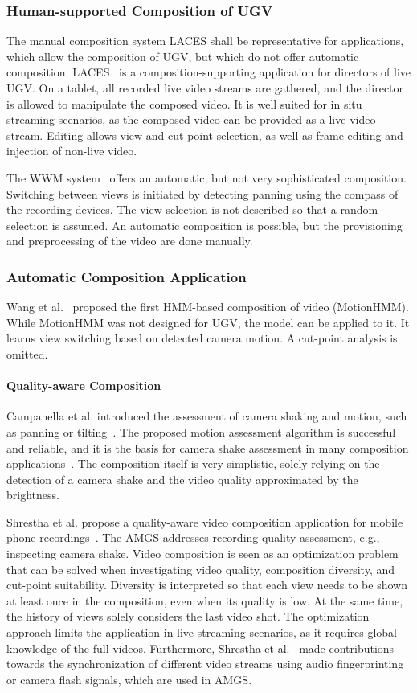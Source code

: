 \subsubsection{Human-supported Composition of UGV}
The manual composition system \ac{LACES} shall be representative for applications, which allow the composition of \ac{UGV}, but which do not offer automatic composition.
\ac{LACES}~\cite{Freeman2014} is a composition-supporting application for directors of live \ac{UGV}.
On a tablet, all recorded live video streams are gathered, and the director is allowed to manipulate the composed video.
It is well suited for in situ streaming scenarios, as the composed video can be provided as a live video stream.
Editing allows view and cut point selection, as well as frame editing and injection of non-live video.

The \ac{WWM} system~\cite{Freeman2014} offers an automatic, but not very sophisticated composition.
Switching between views is initiated by detecting panning using the compass of the recording devices. 
The view selection is not described so that a random selection is assumed.
An automatic composition is possible, but the provisioning and preprocessing of the video are done manually.
\subsubsection{Automatic Composition Application}
Wang et al.~\cite{Wang2008} proposed the first \ac{HMM}-based composition of video (MotionHMM).
While MotionHMM was not designed for \ac{UGV}, the model can be applied to it.
It learns view switching based on detected camera motion. 
A cut-point analysis is omitted.
\paragraph{Quality-aware Composition}
Campanella et al. introduced the assessment of camera shaking and motion, such as panning or tilting~\cite{Campanella2007}.
The proposed motion assessment algorithm is successful and reliable, and it is the basis for camera shake assessment in many composition applications~\cite{Bano2015b,Saini2012,Shrestha2010}.
The composition itself is very simplistic, solely relying on the detection of a camera shake and the video quality approximated by the brightness. 

Shrestha et al. propose a quality-aware video composition application for mobile phone recordings~\cite{Campanella2007}.
The \ac{AMGS} addresses recording quality assessment, e.g., inspecting camera shake.
Video composition is seen as an optimization problem that can be solved when investigating video quality, composition diversity, and cut-point suitability.
Diversity is interpreted so that each view needs to be shown at least once in the composition, even when its quality is low.
At the same time, the history of views solely considers the last video shot.
The optimization approach limits the application in live streaming scenarios, as it requires global knowledge of the full videos.
Furthermore, Shrestha et al.~\cite{Shrestha2007,Shrestha2010b,Shrestha2006} made contributions towards the synchronization of different video streams using audio fingerprinting or camera flash signals, which are used in \ac{AMGS}.


